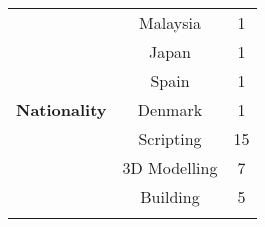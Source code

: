 \begin{table*}[ht]
{\begin{tabular}{ccc}
                                                                                                                                               & Malaysia                                                       & 1                                                                                                        \\
                                                                                                                                               & Japan                                                          & 1                                                                                                        \\
                                                                                                                                               & Spain                                                          & 1                                                                                                        \\
\multirow{-6}{*}{\textbf{Nationality}}                                                                                                         & Denmark                                                        & 1                                                                                                        \\ \hline
\rowcolor[HTML]{F3F3F3} 
\cellcolor[HTML]{F3F3F3}                                                                                                                       & Scripting                                                      & 15                                                                                                       \\
\rowcolor[HTML]{F3F3F3} 
\cellcolor[HTML]{F3F3F3}                                                                                                                       & 3D Modelling                                                   & 7                                                                                                        \\
\rowcolor[HTML]{F3F3F3} 
\cellcolor[HTML]{F3F3F3}                                                                                                                       & Building                                                       & 5                                                                                                        \\
\rowcolor[HTML]{F3F3F3} 

\end{tabular}}
\end{table*}
